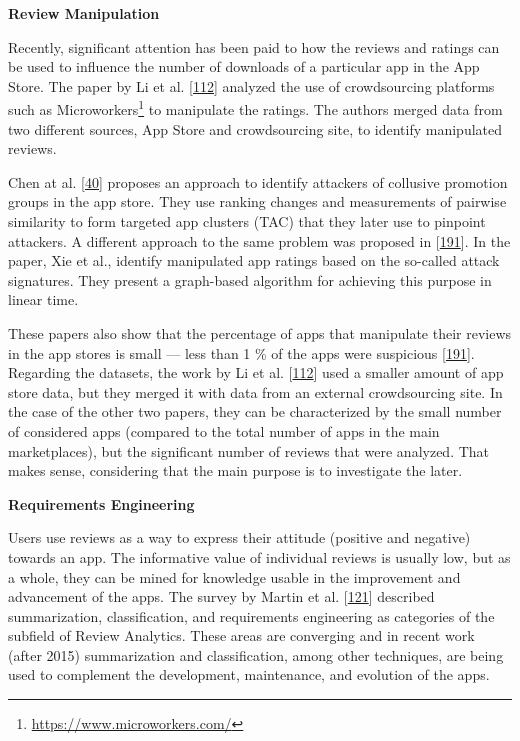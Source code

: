 \documentclass[]{book}
\let\rmarkdownfootnote\footnote%
\def\footnote{\protect\rmarkdownfootnote}
\begin{document}
\textbf{Review Manipulation}

Recently, significant attention has been paid to how the reviews and
ratings can be used to influence the number of downloads of a particular
app in the App Store. The paper by Li et al.
{[}\protect\hyperlink{ref-i2017crowdsourced}{112}{]} analyzed the use of
crowdsourcing platforms such as Microworkers\footnote{\url{https://www.microworkers.com/}}
to manipulate the ratings. The authors merged data from two different
sources, App Store and crowdsourcing site, to identify manipulated
reviews.

Chen at al. {[}\protect\hyperlink{ref-chen2017toward}{40}{]} proposes an
approach to identify attackers of collusive promotion groups in the app
store. They use ranking changes and measurements of pairwise similarity
to form targeted app clusters (TAC) that they later use to pinpoint
attackers. A different approach to the same problem was proposed in
{[}\protect\hyperlink{ref-xie2016you}{191}{]}. In the paper, Xie et al.,
identify manipulated app ratings based on the so-called attack
signatures. They present a graph-based algorithm for achieving this
purpose in linear time.

These papers also show that the percentage of apps that manipulate their
reviews in the app stores is small --- less than 1 \% of the apps were
suspicious {[}\protect\hyperlink{ref-xie2016you}{191}{]}. Regarding the
datasets, the work by Li et al.
{[}\protect\hyperlink{ref-i2017crowdsourced}{112}{]} used a smaller
amount of app store data, but they merged it with data from an external
crowdsourcing site. In the case of the other two papers, they can be
characterized by the small number of considered apps (compared to the
total number of apps in the main marketplaces), but the significant
number of reviews that were analyzed. That makes sense, considering that
the main purpose is to investigate the later.

\textbf{Requirements Engineering}

Users use reviews as a way to express their attitude (positive and
negative) towards an app. The informative value of individual reviews is
usually low, but as a whole, they can be mined for knowledge usable in
the improvement and advancement of the apps. The survey by Martin et al.
{[}\protect\hyperlink{ref-martin2015survey}{121}{]} described
summarization, classification, and requirements engineering as
categories of the subfield of Review Analytics. These areas are
converging and in recent work (after 2015) summarization and
classification, among other techniques, are being used to complement the
development, maintenance, and evolution of the apps.
\end{document}

